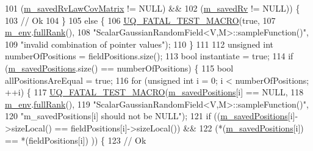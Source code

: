 \begin{DoxyCode}
101            (\hyperlink{class_q_u_e_s_o_1_1_scalar_gaussian_random_field_aca6f26fffd99c7d8fee7a8300e623dcd}{m\_savedRvLawCovMatrix}   != NULL) &&
102            (\hyperlink{class_q_u_e_s_o_1_1_scalar_gaussian_random_field_ab8ca399444079041b75eb0986fe0fc80}{m\_savedRv}               != NULL)) \{
103     \textcolor{comment}{// Ok}
104   \}
105   \textcolor{keywordflow}{else} \{
106     \hyperlink{_defines_8h_a56d63d18d0a6d45757de47fcc06f574d}{UQ\_FATAL\_TEST\_MACRO}(\textcolor{keyword}{true},
107                         \hyperlink{class_q_u_e_s_o_1_1_scalar_gaussian_random_field_af1f041e02404457420e5b32dee70edc3}{m\_env}.\hyperlink{class_q_u_e_s_o_1_1_base_environment_a84a239e42ae443cf71db6e03e8159620}{fullRank}(),
108                         \textcolor{stringliteral}{"ScalarGaussianRandomField<V,M>::sampleFunction()"},
109                         \textcolor{stringliteral}{"invalid combination of pointer values"});
110   \}
111 
112   \textcolor{keywordtype}{unsigned} \textcolor{keywordtype}{int} numberOfPositions = fieldPositions.size();
113   \textcolor{keywordtype}{bool} instantiate = \textcolor{keyword}{true};
114   \textcolor{keywordflow}{if} (\hyperlink{class_q_u_e_s_o_1_1_scalar_gaussian_random_field_a5993884088927e1eb818cb8d473c5be8}{m\_savedPositions}.size() == numberOfPositions) \{
115     \textcolor{keywordtype}{bool} allPositionsAreEqual = \textcolor{keyword}{true};
116     \textcolor{keywordflow}{for} (\textcolor{keywordtype}{unsigned} \textcolor{keywordtype}{int} i = 0; i < numberOfPositions; ++i) \{
117       \hyperlink{_defines_8h_a56d63d18d0a6d45757de47fcc06f574d}{UQ\_FATAL\_TEST\_MACRO}(\hyperlink{class_q_u_e_s_o_1_1_scalar_gaussian_random_field_a5993884088927e1eb818cb8d473c5be8}{m\_savedPositions}[i] == NULL,
118                           \hyperlink{class_q_u_e_s_o_1_1_scalar_gaussian_random_field_af1f041e02404457420e5b32dee70edc3}{m\_env}.\hyperlink{class_q_u_e_s_o_1_1_base_environment_a84a239e42ae443cf71db6e03e8159620}{fullRank}(),
119                           \textcolor{stringliteral}{"ScalarGaussianRandomField<V,M>::sampleFunction()"},
120                           \textcolor{stringliteral}{"m\_savedPositions[i] should not be NULL"});
121       \textcolor{keywordflow}{if} ((\hyperlink{class_q_u_e_s_o_1_1_scalar_gaussian_random_field_a5993884088927e1eb818cb8d473c5be8}{m\_savedPositions}[i]->sizeLocal() == fieldPositions[i]->sizeLocal()) &&
122           (*(\hyperlink{class_q_u_e_s_o_1_1_scalar_gaussian_random_field_a5993884088927e1eb818cb8d473c5be8}{m\_savedPositions}[i])           == *(fieldPositions[i])          )) \{
123         \textcolor{comment}{// Ok}

\end{DoxyCode}
